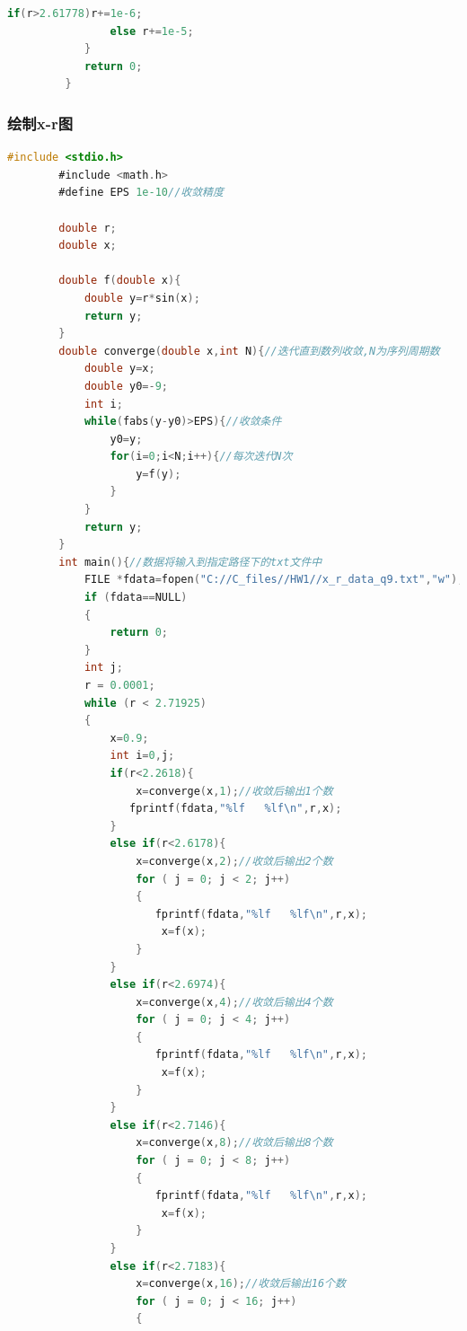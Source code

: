 \documentclass[10pt, a4paper]{article}
\begin{document}
\begin{lstlisting}[language=C]
                if(r>2.61778)r+=1e-6;
                else r+=1e-5;
            }
            return 0;
         }
    \end{lstlisting}
    \subsubsection{绘制x-r图}
    \begin{lstlisting}[language=C]
        #include <stdio.h>
        #include <math.h>
        #define EPS 1e-10//收敛精度
        
        double r;
        double x;
        
        double f(double x){
            double y=r*sin(x);
            return y;
        }
        double converge(double x,int N){//迭代直到数列收敛,N为序列周期数
            double y=x;
            double y0=-9;
            int i;
            while(fabs(y-y0)>EPS){//收敛条件
                y0=y;
                for(i=0;i<N;i++){//每次迭代N次
                    y=f(y);
                }
            }
            return y;
        }
        int main(){//数据将输入到指定路径下的txt文件中
            FILE *fdata=fopen("C://C_files//HW1//x_r_data_q9.txt","w");
            if (fdata==NULL)
            {
                return 0;
            }
            int j;
            r = 0.0001;
            while (r < 2.71925)
            {
                x=0.9;
                int i=0,j;
                if(r<2.2618){
                    x=converge(x,1);//收敛后输出1个数
                   fprintf(fdata,"%lf   %lf\n",r,x);
                }
                else if(r<2.6178){
                    x=converge(x,2);//收敛后输出2个数
                    for ( j = 0; j < 2; j++)
                    {
                       fprintf(fdata,"%lf   %lf\n",r,x);
                        x=f(x);
                    }
                }
                else if(r<2.6974){
                    x=converge(x,4);//收敛后输出4个数
                    for ( j = 0; j < 4; j++)
                    {
                       fprintf(fdata,"%lf   %lf\n",r,x);
                        x=f(x);
                    }
                }
                else if(r<2.7146){
                    x=converge(x,8);//收敛后输出8个数
                    for ( j = 0; j < 8; j++)
                    {
                       fprintf(fdata,"%lf   %lf\n",r,x);
                        x=f(x);
                    }
                }
                else if(r<2.7183){
                    x=converge(x,16);//收敛后输出16个数
                    for ( j = 0; j < 16; j++)
                    {

\end{lstlisting}
\end{document}
